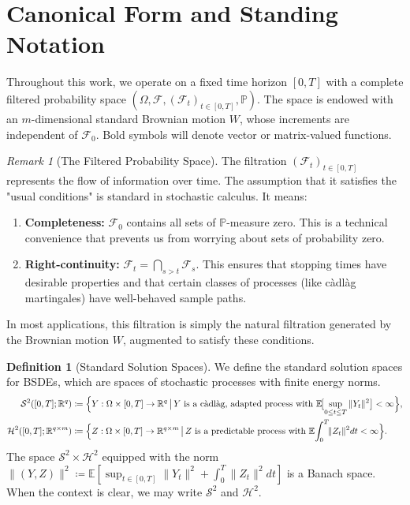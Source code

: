 \documentclass[11pt,letterpaper,oneside]{article}
\theoremstyle{plain}
\theoremstyle{definition}
\newtheorem{definition}[theorem]{Definition}
\theoremstyle{remark}
\newtheorem{remark}{Remark}[section]
\begin{document}
\section{Canonical Form and Standing Notation}
\label{sec:core_notation}

Throughout this work, we operate on a fixed time horizon \([0, T]\) with a complete filtered probability space \((\Omega,\mathcal F,(\mathcal F_t)_{t\in[0,T]},\mathbb P)\). The space is endowed with an $m$-dimensional standard Brownian motion \(W\), whose increments are independent of \(\mathcal{F}_0\). Bold symbols will denote vector or matrix-valued functions.

\begin{remark}[The Filtered Probability Space]
The filtration \((\mathcal F_t)_{t\in[0,T]}\) represents the flow of information over time. The assumption that it satisfies the "usual conditions" is standard in stochastic calculus. It means:
\begin{enumerate}
    \item \textbf{Completeness:} \(\mathcal{F}_0\) contains all sets of \(\mathbb{P}\)-measure zero. This is a technical convenience that prevents us from worrying about sets of probability zero.
    \item \textbf{Right-continuity:} \(\mathcal{F}_t = \bigcap_{s>t} \mathcal{F}_s\). This ensures that stopping times have desirable properties and that certain classes of processes (like c\`adl\`ag martingales) have well-behaved sample paths.
\end{enumerate}
In most applications, this filtration is simply the natural filtration generated by the Brownian motion \(W\), augmented to satisfy these conditions.
\end{remark}

\begin{definition}[Standard Solution Spaces]
We define the standard solution spaces for BSDEs, which are spaces of stochastic processes with finite energy norms.
\begin{align*}
  \mathcal S^2([0,T]; \mathbb{R}^q) &\coloneqq \Bigl\{
        Y:\Omega\times[0,T]\to\mathbb R^q
        \,\big|\,
        Y\text{ is a c\`adl\`ag, adapted process with }
        \mathbb E\!\bigl[\sup_{0\le t\le T}\|Y_t\|^2\bigr]<\infty
      \Bigr\}, \\
  \mathcal H^2([0,T]; \mathbb{R}^{q \times m}) &\coloneqq \Bigl\{
        Z:\Omega\times[0,T]\to\mathbb R^{q\times m}
        \,\big|\,
        Z\text{ is a predictable process with }
        \mathbb E\!\int_0^T \!\!\|Z_t\|^2 dt<\infty
      \Bigr\}.
\end{align*}
The space \(\mathcal{S}^2 \times \mathcal{H}^2\) equipped with the norm \(\| (Y,Z) \|^2 \coloneqq \mathbb E[\sup_{t\in[0,T]}\|Y_t\|^2 + \int_0^T \|Z_t\|^2 dt]\) is a Banach space. When the context is clear, we may write \(\mathcal{S}^2\) and \(\mathcal{H}^2\).
\end{definition}
\end{document}
